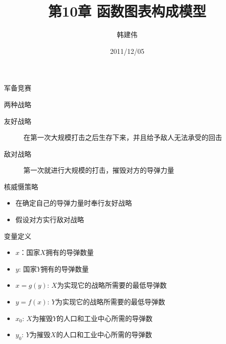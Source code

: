 \documentclass[mathserif, table]{beamer}
\title{第10章 函数图表构成模型}
\author{韩建伟}
\institute{
  浙江工商大学信息学院\\
  \texttt{hanjianwei@mail.zjgsu.edu.cn}
}
\date{2011/12/05}
\begin{document}
\begin{frame}[plain]
  \titlepage{}
\end{frame}

\begin{frame}{军备竞赛}
  
  \begin{block}{两种战略}
    \begin{description}
    \item[友好战略] 在第一次大规模打击之后生存下来，并且给予敌人无法承受的回击
    \item[敌对战略] 第一次就进行大规模的打击，摧毁对方的导弹力量
    \end{description}    
  \end{block}

  
  \begin{block}{核威慑策略} 
    \begin{itemize}
    \item 在确定自己的导弹力量时奉行友好战略
    \item 假设对方实行敌对战略
    \end{itemize}
  \end{block}
  
\end{frame}

\begin{frame}{变量定义}
  \begin{itemize}
  \item $x$：国家$X$拥有的导弹数量
  \item $y$: 国家$Y$拥有的导弹数量
  \item $x=g(y)$: $X$为实现它的战略所需要的最低导弹数
  \item $y=f(x)$: $Y$为实现它的战略所需要的最低导弹数
  \item $x_0$: $X$为摧毁$Y$的人口和工业中心所需的导弹数
  \item $y_0$: $Y$为摧毁$X$的人口和工业中心所需的导弹数
  \end{itemize}
\end{frame}
\end{document}
